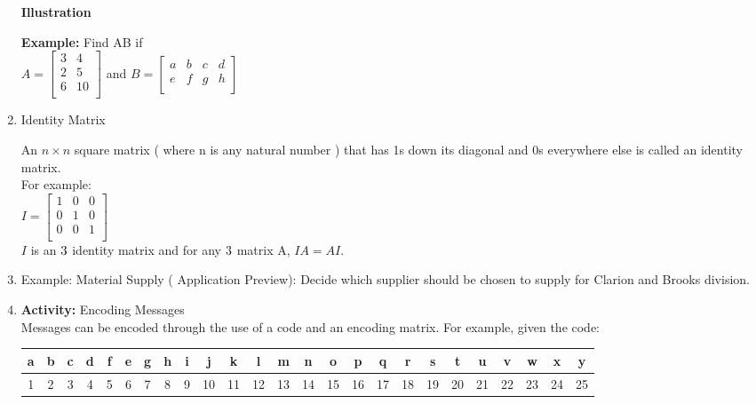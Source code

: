\documentclass[12pt]{amsart}
\begin{document}
\begin{enumerate}
\textbf{Illustration}

\vspace{2in}


\textbf{Example:} Find AB if \\

$A = \begin{bmatrix}
	3 & 4 \\
	2 & 5 \\
	6 & 10 \\
\end{bmatrix}
$ and $B = \begin{bmatrix}
			a & b & c & d \\
			e & f & g & h \\

		\end{bmatrix}	$

\vspace{2in}

\item Identity Matrix 

An $n \times n$ square matrix ( where n is any natural number ) that has 1s down its diagonal and 0s everywhere else is called an identity matrix. \\

For example: \\

$I = \begin{bmatrix}
	1 & 0 & 0 \\
	0 & 1 & 0 \\
	0 & 0 & 1 \\
\end{bmatrix}$ \\

$I$ is an $3 \time 3 $ identity matrix and for any $3 \time 3$ matrix A, $IA = AI$. \\ 

\item Example: Material Supply ( Application Preview):  
Decide which supplier should be chosen to supply for Clarion and Brooks division. \\

\vspace{4in}

\item \textbf{Activity:} Encoding Messages\\
Messages can be encoded through the use of a code and an encoding matrix. For example, given the code: \\

\begin{tabular}{|c|c|c|c|c|c|c|c|c|c|c|c|c|c|c|c|c|c|c|c|c|c|c|c|c|}
\hline
a & b & c & d & f &e &g &h & i & j & k & l & m & n & o & p & q & r & s & t & u & v & w & x & y \\ 
\hline
1 & 2 & 3 & 4 & 5 & 6 & 7 & 8 & 9& 10 & 11 & 12 &13 & 14 &15 &16 & 17 & 18 & 19 & 20 & 21 & 22 & 23 & 24 & 25 \\
\hline
\end{tabular}


\end{enumerate}
\end{document}
